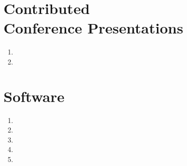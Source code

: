 \documentclass[margin,centered]{res}
\newenvironment{list1}{
  \begin{list}{\ding{113}}{%
      \setlength{\itemsep}{0in}
      \setlength{\parsep}{0in} \setlength{\parskip}{0in}
      \setlength{\topsep}{0in} \setlength{\partopsep}{0in}
      \setlength{\leftmargin}{0.17in}}}{\end{list}}
\newenvironment{list2}{
  \begin{list}{$\bullet$}{%
      \setlength{\itemsep}{0in}
      \setlength{\parsep}{0in} \setlength{\parskip}{0in}
      \setlength{\topsep}{0in} \setlength{\partopsep}{0in}
      \setlength{\leftmargin}{0.2in}}}{\end{list}}
\begin{document}
\begin{resume}
\section{\sc Contributed \\ Conference Presentations}
\begin{enumerate}[leftmargin=*]
\item {}
\item {}
\end{enumerate}



\section{\sc Software} 
\begin{enumerate}[leftmargin=*]
\item {}
\item {}
\item {}
\item {}
\item {}
\end{enumerate}



\begin{comment}
{\bf Institute for Mathematics and Its Applications}, Minneapolis, Minnesota
\begin{list1}
\item[] 
Research Assistant, May 2014--July 2014
\begin{list2}
\vspace*{.05in}
\item
 Developed a model to automatically predict mode of transportation using smartphone sensor data
 \item Manipulated, cleaned, and visualized large time-series data sets in R
\item Contributed random forest methods of final model to Android smartphone application
 \item Presented research findings biweekly, created research poster and paper
\end{list2} 
\end{list1}



\end{comment}
\end{resume}
\end{document}
